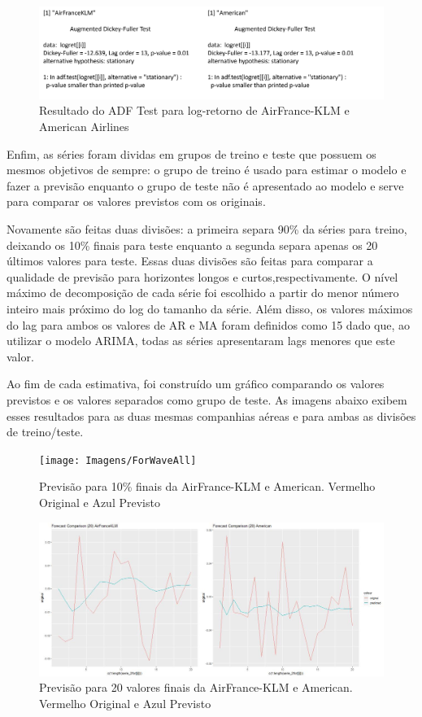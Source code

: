\documentclass[12pt]{article}
\begin{document}
	\begin{figure}[H]
		\centering
		\includegraphics[width=0.9\linewidth]{Imagens/AdfTestWave_LOGRET}
		\caption{Resultado do \textrm{ADF Test} para log-retorno de AirFrance-KLM e American Airlines}
		\label{fig:adftestwave_logret}
	\end{figure}
	
	Enfim, as séries foram dividas em grupos de treino e teste que possuem os mesmos objetivos de sempre: o grupo de treino é usado para estimar o modelo e fazer a previsão enquanto o grupo de teste não é apresentado ao modelo e serve para comparar os valores previstos com os originais.
	
	Novamente são feitas duas divisões: a primeira separa 90\% da séries para treino, deixando os 10\% finais para teste enquanto a segunda separa apenas os 20 últimos valores para teste. Essas duas divisões são feitas para comparar a qualidade de previsão para horizontes longos e curtos,respectivamente. O nível máximo de decomposição de cada série foi escolhido a partir do menor número inteiro mais próximo do log do tamanho da série. Além disso, os valores máximos do \textrm{lag} para ambos os valores de AR e MA foram definidos como 15 dado que, ao utilizar o modelo ARIMA, todas as séries apresentaram \textrm{lags} menores que este valor.
	
	Ao fim de cada estimativa, foi construído um gráfico comparando os valores previstos e os valores separados como grupo de teste. As imagens abaixo exibem esses resultados para as duas mesmas companhias aéreas e para ambas as divisões de treino/teste.
	
	\begin{figure}[H]
		\centering
		\texttt{[image: Imagens/ForWaveAll]}
		\caption{Previsão para 10\% finais da AirFrance-KLM e American. Vermelho Original e Azul Previsto}
		\label{fig:forwaveall}
	\end{figure}
	\begin{figure}[H]
		\centering
		\includegraphics[width=1.0\linewidth]{Imagens/ForWave20}
		\caption{Previsão para 20 valores finais da AirFrance-KLM e American. Vermelho Original e Azul Previsto}
		\label{fig:forwave20}
	\end{figure}
	
\end{document}
